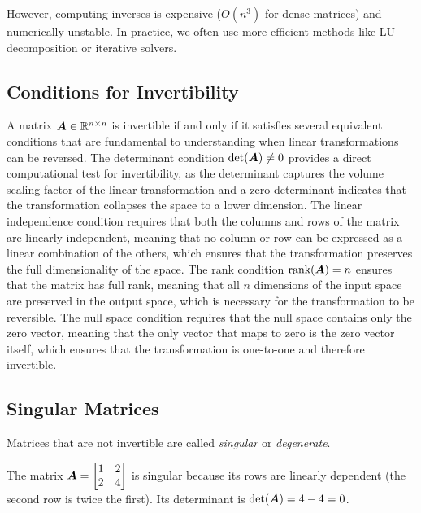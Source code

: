 However, computing inverses is expensive ($O(n^3)$ for dense matrices) and numerically unstable. In practice, we often use more efficient methods like LU decomposition or iterative solvers.

\subsection{Conditions for Invertibility}

A matrix $\boldsymbol{A} \in \mathbb{R}^{n \times n}$ is invertible if and only if it satisfies several equivalent conditions that are fundamental to understanding when linear transformations can be reversed. The determinant condition $\det(\boldsymbol{A}) \neq 0$ provides a direct computational test for invertibility, as the determinant captures the volume scaling factor of the linear transformation and a zero determinant indicates that the transformation collapses the space to a lower dimension. The linear independence condition requires that both the columns and rows of the matrix are linearly independent, meaning that no column or row can be expressed as a linear combination of the others, which ensures that the transformation preserves the full dimensionality of the space. The rank condition $\text{rank}(\boldsymbol{A}) = n$ ensures that the matrix has full rank, meaning that all $n$ dimensions of the input space are preserved in the output space, which is necessary for the transformation to be reversible. The null space condition requires that the null space contains only the zero vector, meaning that the only vector that maps to zero is the zero vector itself, which ensures that the transformation is one-to-one and therefore invertible.

\subsection{Singular Matrices}

Matrices that are not invertible are called \emph{singular} or \emph{degenerate}.

\begin{example}
The matrix $\boldsymbol{A} = \begin{bmatrix} 1 & 2 \\ 2 & 4 \end{bmatrix}$ is singular because its rows are linearly dependent (the second row is twice the first). Its determinant is $\det(\boldsymbol{A}) = 4 - 4 = 0$.
\end{example}

